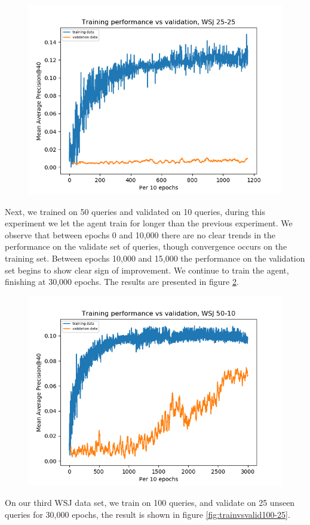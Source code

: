 \begin{figure}[H]
	\centering
	\includegraphics[width=0.7\linewidth]{images/chapter_4/second_system/train_vs_valid_25-25}
	\caption{}
	\label{fig:trainvsvalid25-25}
\end{figure}

Next, we trained on 50 queries and validated on 10 queries, during this experiment we let the agent train for longer than the previous experiment. We observe that between epochs 0 and 10,000 there are no clear trends in the performance on the validate set of queries, though convergence occurs on the training set. Between epochs 10,000 and 15,000 the performance on the validation set begins to show clear sign of improvement. We continue to train the agent, finishing at 30,000 epochs. The results are presented in figure \ref{fig:trainvsvalid50-10}. 


\begin{figure}[H]
	\centering
	\includegraphics[width=0.7\linewidth]{images/chapter_4/second_system/train_vs_valid_50-10}
	\caption{}
	\label{fig:trainvsvalid50-10}
\end{figure}

On our third WSJ data set, we train on 100 queries, and validate on 25 unseen queries for 30,000 epochs, the result is shown in figure \ref{fig:trainvsvalid100-25}. 

